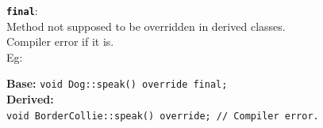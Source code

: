 \textbf{\texttt{final}}:\\
Method not supposed to be overridden in derived classes.\\
Compiler error if it is.\\

Eg:
\begin{mdframed}[nobreak=true,backgroundcolor=gray!10,linecolor=Firebrick4]
\textbf{Base:} \texttt{void Dog::speak() override final;}\\
\textbf{Derived:} \\
\texttt{void BorderCollie::speak() override; // Compiler error.}
\end{mdframed}